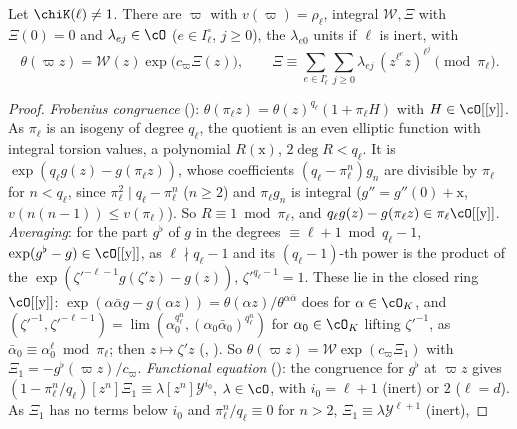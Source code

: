 \begin{theorem}
\label{der:thm:exponent}
Let $\chiK(\ell)\ne1$. There are $\varpi$ with $v(\varpi)=\rho_\ell$, integral $\mathcal W,\Xi$
with $\Xi(0)=0$ and $\lambda_{ej}\in\cO$ ($e\in I_\ell^\circ$, $j\ge0$), the $\lambda_{e0}$ units if
$\ell$ is inert, with
\[
\theta(\varpi z)=\mathcal W(z)\exp\bigl(c_\varpi\Xi(z)\bigr),\qquad
\Xi\equiv\textstyle\sum_{e\in I_\ell^\circ}\sum_{j\ge0}\lambda_{ej}\,(z^{\ell^e}z)^{\ell^j}\pmod{\pi_\ell}.
\]
\end{theorem}

\begin{proof}
\emph{Frobenius congruence} ():
$\theta(\pi_\ell z)=\theta(z)^{q_\ell}(1+\pi_\ell H)$ with $H\in\cO[[\mathrm y]]$. As $\pi_\ell$ is an
isogeny of degree $q_\ell$, the quotient is an even elliptic function with integral torsion values,
a polynomial $R(\mathrm x)$, $2\deg R<q_\ell$. It is $\exp(q_\ell g(z)-g(\pi_\ell z))$, whose
coefficients $(q_\ell-\pi_\ell^n)g_n$ are divisible by $\pi_\ell$ for $n<q_\ell$, since
$\pi_\ell^2\mid q_\ell-\pi_\ell^n$ ($n\ge2$) and $\pi_\ell g_n$ is integral
($g''=g''(0)+\mathrm x$, $v(n(n-1))\le v(\pi_\ell)$).
So $R\equiv1\bmod\pi_\ell$, and $q_\ell g(z)-g(\pi_\ell z)\in\pi_\ell\cO[[\mathrm y]]$.
\emph{Averaging}: for the part $g^\flat$ of $g$ in the degrees $\equiv\ell+1\bmod q_\ell-1$,
$\exp(g^\flat-g)\in\cO[[\mathrm y]]$, as $\ell\nmid q_\ell-1$ and its $(q_\ell-1)$-th power is the
product of the $\exp(\zeta'^{-\ell-1}g(\zeta'z)-g(z))$, $\zeta'^{q_\ell-1}=1$. These lie in the
closed ring $\cO[[\mathrm y]]$: $\exp(\alpha\bar\alpha g-g(\alpha z))=\theta(\alpha z)/\theta^{\alpha\bar\alpha}$
does for $\alpha\in\cO_K$, and
$(\zeta'^{-1},\zeta'^{-\ell-1})=\lim(\alpha_0^{q_\ell^n},(\alpha_0\bar\alpha_0)^{q_\ell^n})$ for
$\alpha_0\in\cO_K$ lifting $\zeta'^{-1}$, as $\bar\alpha_0\equiv\alpha_0^\ell\bmod\pi_\ell$; then
$z\mapsto\zeta'z$
(,
). So
$\theta(\varpi z)=\mathcal W\exp(c_\varpi\Xi_1)$ with $\Xi_1=-g^\flat(\varpi z)/c_\varpi$.
\emph{Functional equation} (): the
congruence for $g^\flat$ at $\varpi z$ gives
$(1-\pi_\ell^n/q_\ell)[z^n]\Xi_1\equiv\lambda[z^n]\mathcal Y^{i_0}$, $\lambda\in\cO$, with
$i_0=\ell+1$ (inert) or $2$ ($\ell=d$). As $\Xi_1$ has no terms below $i_0$ and
$\pi_\ell^n/q_\ell\equiv0$ for $n>2$, $\Xi_1\equiv\lambda\mathcal Y^{\ell+1}$ (inert),

\end{proof}
